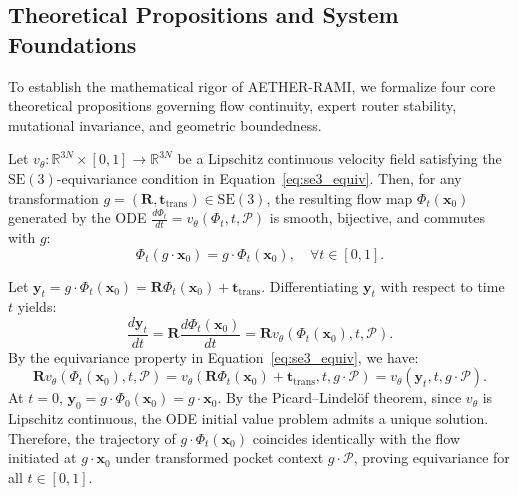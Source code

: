 \subsection{Theoretical Propositions and System Foundations}
To establish the mathematical rigor of AETHER-RAMI, we formalize four core theoretical propositions governing flow continuity, expert router stability, mutational invariance, and geometric boundedness.

\begin{proposition}
\label{prop:se3_continuity}
Let $v_\theta: \mathbb{R}^{3N} \times [0, 1] \to \mathbb{R}^{3N}$ be a Lipschitz continuous velocity field satisfying the $\mathrm{SE}(3)$-equivariance condition in Equation~\eqref{eq:se3_equiv}. Then, for any transformation $g = (\mathbf{R}, \mathbf{t}_{\text{trans}}) \in \mathrm{SE}(3)$, the resulting flow map $\Phi_t(\mathbf{x}_0)$ generated by the ODE $\frac{d\Phi_t}{dt} = v_\theta(\Phi_t, t, \mathcal{P})$ is smooth, bijective, and commutes with $g$:
\begin{equation}
\Phi_t(g \cdot \mathbf{x}_0) = g \cdot \Phi_t(\mathbf{x}_0), \quad \forall t \in [0, 1].
\end{equation}
\end{proposition}

\begin{IEEEproof}
Let $\mathbf{y}_t = g \cdot \Phi_t(\mathbf{x}_0) = \mathbf{R} \Phi_t(\mathbf{x}_0) + \mathbf{t}_{\text{trans}}$. Differentiating $\mathbf{y}_t$ with respect to time $t$ yields:
\begin{equation*}
\frac{d\mathbf{y}_t}{dt} = \mathbf{R} \frac{d\Phi_t(\mathbf{x}_0)}{dt} = \mathbf{R} v_\theta(\Phi_t(\mathbf{x}_0), t, \mathcal{P}).
\end{equation*}
By the equivariance property in Equation~\eqref{eq:se3_equiv}, we have:
\begin{equation*}
\mathbf{R} v_\theta(\Phi_t(\mathbf{x}_0), t, \mathcal{P}) = v_\theta(\mathbf{R} \Phi_t(\mathbf{x}_0) + \mathbf{t}_{\text{trans}}, t, g \cdot \mathcal{P}) = v_\theta(\mathbf{y}_t, t, g \cdot \mathcal{P}).
\end{equation*}
At $t=0$, $\mathbf{y}_0 = g \cdot \Phi_0(\mathbf{x}_0) = g \cdot \mathbf{x}_0$. By the Picard--Lindel{\"o}f theorem, since $v_\theta$ is Lipschitz continuous, the ODE initial value problem admits a unique solution. Therefore, the trajectory of $g \cdot \Phi_t(\mathbf{x}_0)$ coincides identically with the flow initiated at $g \cdot \mathbf{x}_0$ under transformed pocket context $g \cdot \mathcal{P}$, proving equivariance for all $t \in [0, 1]$.
\end{IEEEproof}

